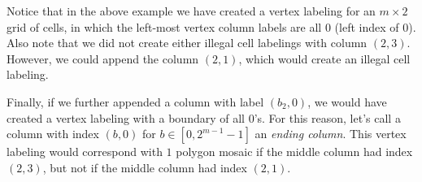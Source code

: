 \documentclass[12pt]{article}
\theoremstyle{plain}
\theoremstyle{definition}
\theoremstyle{remark}
\theoremstyle{definition}
\newcommand{\cell}[4]{ \draw[thick] ( #1 , #2 ) rectangle ( #3 , #4 );}
\newcommand{\lablnode}[3]{\node[shape=circle,draw=none,fill=none, inner sep=0pt,minimum size=5pt] (A) at ( #1 , #2 ) {#3};}
\newcommand{\lablvertex}[3]{\node[shape=circle,draw=none,fill=white, inner sep=2pt,minimum size=5pt] (A) at ( #1 , #2 ) {#3};}
\begin{document}
\begin{center}
\end{center}

Notice that in the above example we have created a vertex labeling for an $m \times 2$ grid of cells, in which the left-most vertex column labels are all $0$ (left index of $0$). Also note that we did not create either illegal cell labelings with column $(2,3)$. However, we could append the column $(2,1)$, which would create an illegal cell labeling. 

Finally, if we further appended a column with label $(b_2,0)$, we would have created a vertex labeling with a boundary of all $0$'s. For this reason, let's call a column with index $(b,0)$ for $b \in [0,2^{m-1}-1]$ an \textit{ending column}. This vertex labeling would correspond with $1$ polygon mosaic if the middle column had index $(2,3)$, but not if the middle column had index $(2,1)$.
\end{document}
